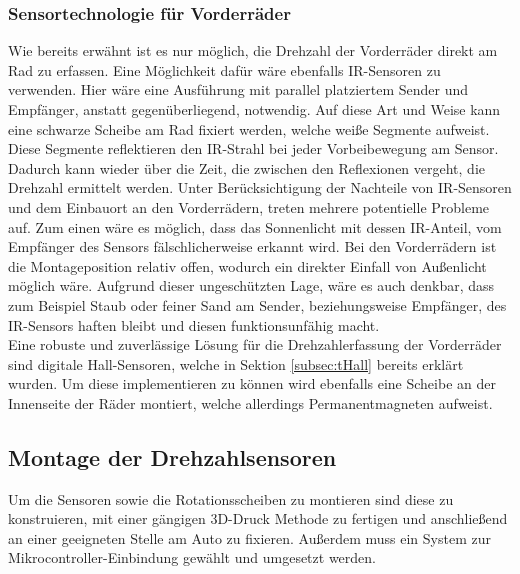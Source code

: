 \subsubsection{Sensortechnologie für Vorderräder}
\label{subsubsec:RPMchoiceFront}
Wie bereits erwähnt ist es nur möglich, die Drehzahl der Vorderräder direkt am Rad zu erfassen. Eine Möglichkeit dafür wäre ebenfalls \ac{IR}-Sensoren zu verwenden. Hier wäre eine Ausführung mit parallel platziertem Sender und Empfänger, anstatt gegenüberliegend, notwendig. Auf diese Art und Weise kann eine schwarze Scheibe am Rad fixiert werden, welche weiße Segmente aufweist. Diese Segmente reflektieren den \ac{IR}-Strahl bei jeder Vorbeibewegung am Sensor. Dadurch kann wieder über die Zeit, die zwischen den Reflexionen vergeht, die Drehzahl ermittelt werden. Unter Berücksichtigung der Nachteile von \ac{IR}-Sensoren und dem Einbauort an den Vorderrädern, treten mehrere potentielle Probleme auf. Zum einen wäre es möglich, dass das Sonnenlicht mit dessen \ac{IR}-Anteil, vom Empfänger des Sensors fälschlicherweise erkannt wird. Bei den Vorderrädern ist die Montageposition relativ offen, wodurch ein direkter Einfall von Außenlicht möglich wäre. Aufgrund dieser ungeschützten Lage, wäre es auch denkbar, dass zum Beispiel Staub oder feiner Sand am Sender, beziehungsweise Empfänger, des \ac{IR}-Sensors haften bleibt und diesen funktionsunfähig macht.\\
Eine robuste und zuverlässige Lösung für die Drehzahlerfassung der Vorderräder sind digitale Hall-Sensoren, welche in Sektion \ref{subsec:tHall} bereits erklärt wurden. Um diese implementieren zu können wird ebenfalls eine Scheibe an der Innenseite der Räder montiert, welche allerdings Permanentmagneten aufweist.


\subsection{Montage der Drehzahlsensoren}
\label{subsec:RPMmount}
Um die Sensoren sowie die Rotationsscheiben zu montieren sind diese zu konstruieren, mit einer gängigen 3D-Druck Methode zu fertigen und anschließend an einer geeigneten Stelle am Auto zu fixieren. Außerdem muss ein System zur Mikrocontroller-Einbindung gewählt und umgesetzt werden.

